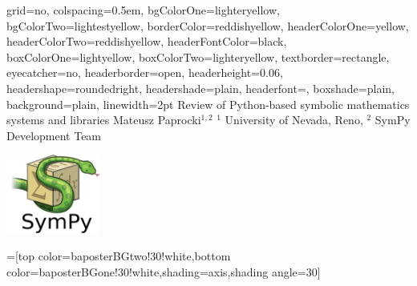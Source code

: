 \documentclass[portrait]{baposter}
\begin{document}
\begin{poster}{
  grid=no,
  colspacing=0.5em,
  bgColorOne=lighteryellow,
  bgColorTwo=lightestyellow,
  borderColor=reddishyellow,
  headerColorOne=yellow,
  headerColorTwo=reddishyellow,
  headerFontColor=black,
  boxColorOne=lightyellow,
  boxColorTwo=lighteryellow,
  textborder=rectangle,
  eyecatcher=no,
  headerborder=open,
  headerheight=0.06\textheight,
  headershape=roundedright,
  headershade=plain,
  headerfont=\large\textsf, %
  boxshade=plain,
  background=plain,
  linewidth=2pt
  }
  {} %
  {\sf %
  Review of Python-based symbolic mathematics systems and libraries}
  {\sf %
  Mateusz Paprocki$^{1,2}$
  \hspace{3em}
  $^1$ University of Nevada, Reno,
  $^2$ SymPy Development Team
  }
  {{\begin{minipage}{12em}
    \hfill
    \includegraphics[height=7.0em]{sympy-logo}
  \end{minipage}}
  }

  =[top color=baposterBGtwo!30!white,bottom color=baposterBGone!30!white,shading=axis,shading angle=30]

     \newlength{\leftimgwidth}
     \setlength{\leftimgwidth}{0.78em+8.0em}



\end{poster}
\end{document}
